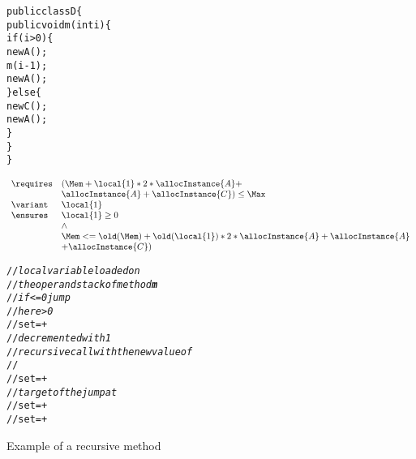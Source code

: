 \begin{figure}[!hbp]
\begin{alltt}
public class D \{
  public void m( int i) \{
    if (i > 0) \{
      new A();
      m(i - 1);
      new A();
    \} else \{
      new C();
      new A();
   \}
  \}
\}
\end{alltt}

$$
\begin{array}{ll}
 \requires & ( \Mem + \local{1}*2*\allocInstance{A} + \\
           &  \allocInstance{A} + \allocInstance{C}) \le \Max \\
 \variant  & \local{1} \\
 \ensures  & \local{1} \ge 0 \\
           & \wedge \\
           & \Mem <= \old(\Mem) +  \old(\local{1})*2*\allocInstance{A} + \allocInstance{A}\\
           &  +  \allocInstance{C})
\end{array}$$

\begin{alltt}
//\small{\textit{local variable loaded on} }
//\small{\textit{the operand stack of method \textbf{m}}}
//\small{ \textit{ if  <= 0 jump}}
 //\small{ \textit{ here  > 0  } }
//set \Mem = \Mem +  
//\small{\textit{ decremented with 1}}
//\small{ \textit{ recursive call with the new value of }}
//
//set \Mem = \Mem +  
//\small{\textit{target of the jump at }}
//set \Mem = \Mem +  
//set \Mem = \Mem +  
\end{alltt}

\caption{\sc Example of a recursive method}
 \label{recMeth}
\end{figure}

